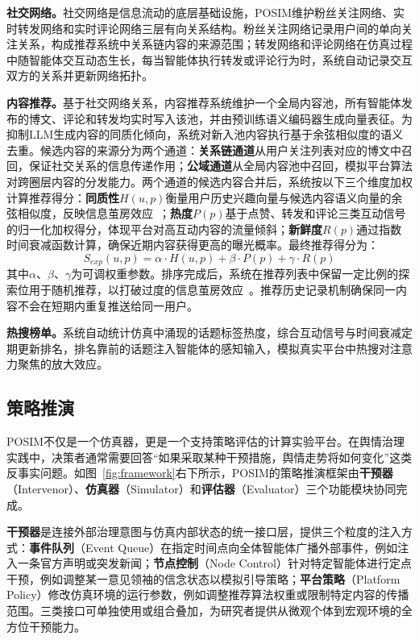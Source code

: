 \documentclass[a4paper,fleqn]{cas-sc}
\begin{document}
\textbf{社交网络。}社交网络是信息流动的底层基础设施，POSIM维护粉丝关注网络、实时转发网络和实时评论网络三层有向关系结构。粉丝关注网络记录用户间的单向关注关系，构成推荐系统中关系链内容的来源范围；转发网络和评论网络在仿真过程中随智能体交互动态生长，每当智能体执行转发或评论行为时，系统自动记录交互双方的关系并更新网络拓扑。

\textbf{内容推荐。}基于社交网络关系，内容推荐系统维护一个全局内容池，所有智能体发布的博文、评论和转发均实时写入该池，并由预训练语义编码器生成向量表征。为抑制LLM生成内容的同质化倾向，系统对新入池内容执行基于余弦相似度的语义去重。候选内容的来源分为两个通道：\textbf{关系链通道}从用户关注列表对应的博文中召回，保证社交关系的信息传递作用；\textbf{公域通道}从全局内容池中召回，模拟平台算法对跨圈层内容的分发能力。两个通道的候选内容合并后，系统按以下三个维度加权计算推荐得分：\textbf{同质性}$H(u,p)$衡量用户历史兴趣向量与候选内容语义向量的余弦相似度，反映信息茧房效应~\citep{cinelli_echo_2021}；\textbf{热度}$P(p)$基于点赞、转发和评论三类互动信号的归一化加权得分，体现平台对高互动内容的流量倾斜；\textbf{新鲜度}$R(p)$通过指数时间衰减函数计算，确保近期内容获得更高的曝光概率。最终推荐得分为：
\begin{equation}
S_{exp}(u, p) = \alpha \cdot H(u, p) + \beta \cdot P(p) + \gamma \cdot R(p)
\label{eq:recommend}
\end{equation}
其中$\alpha$、$\beta$、$\gamma$为可调权重参数。排序完成后，系统在推荐列表中保留一定比例的探索位用于随机推荐，以打破过度的信息茧房效应~\citep{bail_opposing_2018}。推荐历史记录机制确保同一内容不会在短期内重复推送给同一用户。

\textbf{热搜榜单。}系统自动统计仿真中涌现的话题标签热度，综合互动信号与时间衰减定期更新排名，排名靠前的话题注入智能体的感知输入，模拟真实平台中热搜对注意力聚焦的放大效应。

\subsection{策略推演}\label{subsec:strategy}

POSIM不仅是一个仿真器，更是一个支持策略评估的计算实验平台。在舆情治理实践中，决策者通常需要回答“如果采取某种干预措施，舆情走势将如何变化”这类反事实问题。如图~\ref{fig:framework}右下所示，POSIM的策略推演框架由\textbf{干预器}（Intervenor）、\textbf{仿真器}（Simulator）和\textbf{评估器}（Evaluator）三个功能模块协同完成。

\textbf{干预器}是连接外部治理意图与仿真内部状态的统一接口层，提供三个粒度的注入方式：\textbf{事件队列}（Event Queue）在指定时间点向全体智能体广播外部事件，例如注入一条官方声明或突发新闻；\textbf{节点控制}（Node Control）针对特定智能体进行定点干预，例如调整某一意见领袖的信念状态以模拟引导策略；\textbf{平台策略}（Platform Policy）修改仿真环境的运行参数，例如调整推荐算法权重或限制特定内容的传播范围。三类接口可单独使用或组合叠加，为研究者提供从微观个体到宏观环境的全方位干预能力。
\end{document}

